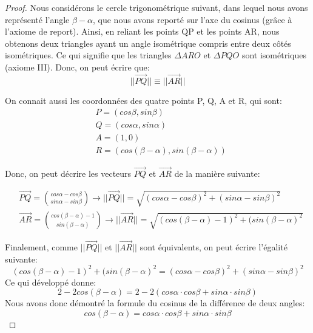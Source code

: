 \documentclass[a4paper,12pt]{article}
\begin{document}
\begin{proof}
Nous considérons le cercle trigonométrique suivant, dans lequel nous avons représenté l'angle $\beta-\alpha$, que nous avons reporté sur l'axe du cosinus (grâce à l'axiome de report). Ainsi, en reliant les points QP et les points AR, nous obtenons deux triangles ayant un angle isométrique compris entre deux côtés isométriques. Ce qui signifie que les triangles $\Delta ARO$ et $\Delta PQO$ sont isométriques (axiome III). Donc, on peut écrire que:
\begin{equation}
    ||\vec{PQ}|| \equiv ||\vec{AR}||
\end{equation}

On connait aussi les coordonnées des quatre points P, Q, A et R, qui sont:
\begin{equation}
\begin{split}
   & P = (cos \beta, sin \beta)\\
   & Q = (cos \alpha, sin \alpha)\\
   & A = (1, 0)\\
   & R = (cos (\beta-\alpha), sin (\beta-\alpha))
\end{split}
\end{equation}

Donc, on peut décrire les vecteurs $\vec{PQ}$ et $\vec{AR}$ de la manière suivante:

\begin{equation}
\begin{split}
 & \vec{PQ} = \binom{cos\alpha-cos\beta}{sin\alpha-sin\beta} \rightarrow ||\vec{PQ}|| = \sqrt{(cos\alpha-cos\beta)^2 + (sin\alpha-sin\beta)^2}\\
 & \vec{AR} = \binom{cos(\beta-\alpha)-1}{sin(\beta-\alpha)} \rightarrow ||\vec{AR}|| = \sqrt{(cos(\beta-\alpha)-1)^2 + (sin(\beta-\alpha)^2}
\end{split}
\end{equation}

Finalement, comme $||\vec{PQ}||$ et $||\vec{AR}||$ sont équivalents, on peut écrire l'égalité suivante:
\begin{equation}
(cos(\beta-\alpha)-1)^2 + (sin(\beta-\alpha)^2 = (cos\alpha-cos\beta)^2 + (sin\alpha-sin\beta)^2
\end{equation}
Ce qui développé donne:
\begin{equation}
2-2cos(\beta-\alpha) = 2-2(cos \alpha \cdot cos \beta + sin \alpha \cdot sin \beta)
\end{equation}
Nous avons donc démontré la formule du cosinus de la différence de deux angles:
\begin{equation*}
    cos(\beta-\alpha) = cos \alpha \cdot cos \beta + sin \alpha \cdot sin \beta
\end{equation*}
\end{proof}
\end{document}
